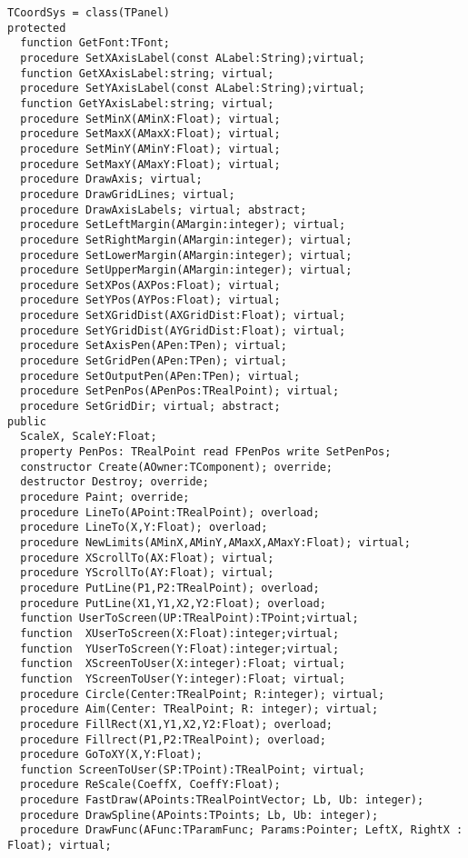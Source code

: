 \documentclass[12pt,a4paper,oneside]{report}
\begin{document}
\begin{verbatim}
TCoordSys = class(TPanel)
protected
  function GetFont:TFont;
  procedure SetXAxisLabel(const ALabel:String);virtual;
  function GetXAxisLabel:string; virtual;
  procedure SetYAxisLabel(const ALabel:String);virtual;
  function GetYAxisLabel:string; virtual;
  procedure SetMinX(AMinX:Float); virtual;
  procedure SetMaxX(AMaxX:Float); virtual;
  procedure SetMinY(AMinY:Float); virtual;
  procedure SetMaxY(AMaxY:Float); virtual;
  procedure DrawAxis; virtual;
  procedure DrawGridLines; virtual;
  procedure DrawAxisLabels; virtual; abstract; 
  procedure SetLeftMargin(AMargin:integer); virtual;
  procedure SetRightMargin(AMargin:integer); virtual;
  procedure SetLowerMargin(AMargin:integer); virtual;
  procedure SetUpperMargin(AMargin:integer); virtual;
  procedure SetXPos(AXPos:Float); virtual;
  procedure SetYPos(AYPos:Float); virtual;
  procedure SetXGridDist(AXGridDist:Float); virtual;
  procedure SetYGridDist(AYGridDist:Float); virtual;
  procedure SetAxisPen(APen:TPen); virtual;
  procedure SetGridPen(APen:TPen); virtual;
  procedure SetOutputPen(APen:TPen); virtual;
  procedure SetPenPos(APenPos:TRealPoint); virtual;
  procedure SetGridDir; virtual; abstract;
public
  ScaleX, ScaleY:Float;
  property PenPos: TRealPoint read FPenPos write SetPenPos;
  constructor Create(AOwner:TComponent); override;
  destructor Destroy; override;
  procedure Paint; override;
  procedure LineTo(APoint:TRealPoint); overload; 
  procedure LineTo(X,Y:Float); overload;
  procedure NewLimits(AMinX,AMinY,AMaxX,AMaxY:Float); virtual;
  procedure XScrollTo(AX:Float); virtual;
  procedure YScrollTo(AY:Float); virtual;
  procedure PutLine(P1,P2:TRealPoint); overload;
  procedure PutLine(X1,Y1,X2,Y2:Float); overload;
  function UserToScreen(UP:TRealPoint):TPoint;virtual;
  function  XUserToScreen(X:Float):integer;virtual;
  function  YUserToScreen(Y:Float):integer;virtual;
  function  XScreenToUser(X:integer):Float; virtual;
  function  YScreenToUser(Y:integer):Float; virtual;
  procedure Circle(Center:TRealPoint; R:integer); virtual;
  procedure Aim(Center: TRealPoint; R: integer); virtual;
  procedure FillRect(X1,Y1,X2,Y2:Float); overload;
  procedure Fillrect(P1,P2:TRealPoint); overload;
  procedure GoToXY(X,Y:Float);
  function ScreenToUser(SP:TPoint):TRealPoint; virtual;
  procedure ReScale(CoeffX, CoeffY:Float);
  procedure FastDraw(APoints:TRealPointVector; Lb, Ub: integer);
  procedure DrawSpline(APoints:TPoints; Lb, Ub: integer);
  procedure DrawFunc(AFunc:TParamFunc; Params:Pointer; LeftX, RightX : Float); virtual;

\end{verbatim}
\end{document}
